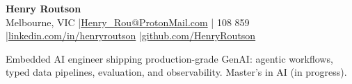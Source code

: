 \documentclass[10pt, a4paper]{article}
\begin{document}
\begin{center}
  {\LARGE\bfseries Henry Routson} \\[3pt]
  Melbourne, VIC
  \quad|\quad \href{mailto:Henry_Rou@ProtonMail.com}{Henry\_Rou@ProtonMail.com}
  \quad| 108 859
  \quad|\quad \href{https://www.linkedin.com/in/henryroutson/}{linkedin.com/in/henryroutson}
  \quad|\quad \href{https://github.com/HenryRoutson}{github.com/HenryRoutson}
\end{center}

\noindent
Embedded AI engineer shipping production-grade GenAI: agentic workflows, typed data pipelines, evaluation, and observability. Master's in AI (in progress).

\vspace{1pt}
\end{document}
